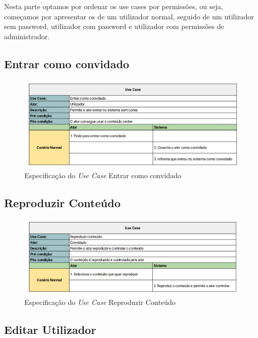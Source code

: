 \documentclass[a4paper]{report}
\begin{document}
Nesta parte optamos por ordenar os use cases por permissões, ou seja, começamos
por apresentar os de um utilizador normal, seguido de um utilizador sem
password, utilizador com password e utilizador com permissões de administrador.

\subsection{Entrar como convidado}

\begin{figure}[H]
	\centering 
    \includegraphics[width=\textwidth]{images/Entrar_como_convidado.png}  
    \caption{Especificação do \emph{Use Case} Entrar como convidado}
\end{figure}

\subsection{Reproduzir Conteúdo}

\begin{figure}[H]
	\centering 
    \includegraphics[width=\textwidth]{images/Media_Control.png}  
    \caption{Especificação do \emph{Use Case} Reproduzir Conteúdo}
\end{figure}

\subsection{Editar Utilizador}
\end{document}
